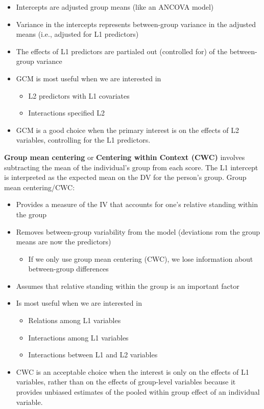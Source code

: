 \documentclass[
  11pt,
]{book}
\providecommand{\tightlist}{%
  \setlength{\itemsep}{0pt}\setlength{\parskip}{0pt}}
\begin{document}
\begin{itemize}
\tightlist
\item
  Intercepts are adjusted group means (like an ANCOVA model)
\item
  Variance in the intercepts represents between-group variance in the adjusted means (i.e., adjusted for L1 predictors)
\item
  The effects of L1 predictors are partialed out (controlled for) of the between-group variance
\item
  GCM is most useful when we are interested in

  \begin{itemize}
  \tightlist
  \item
    L2 predictors with L1 covariates
  \item
    Interactions specified L2
  \end{itemize}
\item
  GCM is a good choice when the primary interest is on the effects of L2 variables, controlling for the L1 predictors.
\end{itemize}

\textbf{Group mean centering} or \textbf{Centering within Context (CWC)} involves subtracting the mean of the individual's group from each score. The L1 intercept is interpreted as the expected mean on the DV for the person's group. Group mean centering/CWC:

\begin{itemize}
\tightlist
\item
  Provides a measure of the IV that accounts for one's relative standing within the group
\item
  Removes between-group variability from the model (deviations rom the group means are now the predictors)

  \begin{itemize}
  \tightlist
  \item
    If we only use group mean centering (CWC), we lose information about between-group differences
  \end{itemize}
\item
  Assumes that relative standing within the group is an important factor
\item
  Is most useful when we are interested in

  \begin{itemize}
  \tightlist
  \item
    Relations among L1 variables
  \item
    Interactions among L1 variables
  \item
    Interactions between L1 and L2 variables
  \end{itemize}
\item
  CWC is an acceptable choice when the interest is only on the effects of L1 variables, rather than on the effects of group-level variables because it provides unbiased estimates of the pooled within group effect of an individual variable.
\end{itemize}
\end{document}
